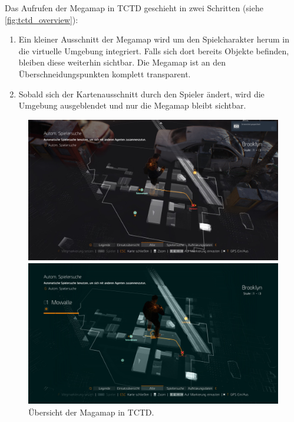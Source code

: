 Das Aufrufen der Megamap in TCTD geschieht in zwei Schritten (siehe \autoref{fig:tctd_overview}):
\begin{enumerate}
    \item Ein kleiner Ausschnitt der Megamap wird um den Spielcharakter herum in die virtuelle Umgebung integriert.
    Falls sich dort bereits Objekte befinden, bleiben diese weiterhin sichtbar.
    Die Megamap ist an den Überschneidungspunkten komplett transparent.
    \item Sobald sich der Kartenausschnitt durch den Spieler ändert, wird die Umgebung ausgeblendet und nur die Megamap bleibt sichtbar.
\end{enumerate}
\begin{figure}[h!]
    \centering
    \includegraphics[width=\linewidth]{figures/concept/the_division_overlap}

    \includegraphics[width=\linewidth]{figures/concept/the_division_5}
    
    \caption{Übersicht der Magamap in TCTD.}
    \label{fig:tctd_overview}
\end{figure}

